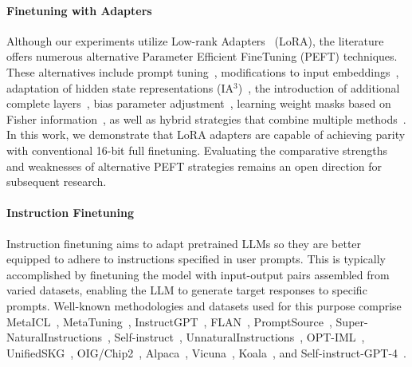 \paragraph{Finetuning with Adapters} Although our experiments utilize Low-rank Adapters~\citep{hu2021lora} (LoRA), the literature offers numerous alternative Parameter Efficient FineTuning (PEFT) techniques. These alternatives include prompt tuning~\citep{qin2021learning,lester2021power,li2021prefix}, modifications to input embeddings~\citep{an2022input}, adaptation of hidden state representations (IA$^3$)~\citep{liu2022few}, the introduction of additional complete layers~\citep{houlsby2019parameter}, bias parameter adjustment~\citep{zaken2021bitfit}, learning weight masks based on Fisher information~\citep{sung2021training}, as well as hybrid strategies that combine multiple methods~\citep{henderson2021compacter}. In this work, we demonstrate that LoRA adapters are capable of achieving parity with conventional 16-bit full finetuning. Evaluating the comparative strengths and weaknesses of alternative PEFT strategies remains an open direction for subsequent research.

\paragraph{Instruction Finetuning} Instruction finetuning aims to adapt pretrained LLMs so they are better equipped to adhere to instructions specified in user prompts. This is typically accomplished by finetuning the model with input-output pairs assembled from varied datasets, enabling the LLM to generate target responses to specific prompts. Well-known methodologies and datasets used for this purpose comprise MetaICL~\citep{min2021metaicl}, MetaTuning~\citep{zhong2021adapting}, InstructGPT~\citep{ouyang2022training}, FLAN~\citep{wei2021finetuned,chung2022scaling}, PromptSource~\citep{bach2022promptsource}, Super-NaturalInstructions~\citep{wang2022super,sanh2021multitask}, Self-instruct~\citep{wang2022self}, UnnaturalInstructions~\citep{honovich2022unnatural}, OPT-IML~\citep{iyer2022opt}, UnifiedSKG~\citep{xie2022unifiedskg}, OIG/Chip2~\citep{laion2023}, Alpaca~\citep{alpaca}, Vicuna~\citep{vicuna2023}, Koala~\citep{koala_blogpost_2023}, and Self-instruct-GPT-4~\citep{peng2023instruction}.

